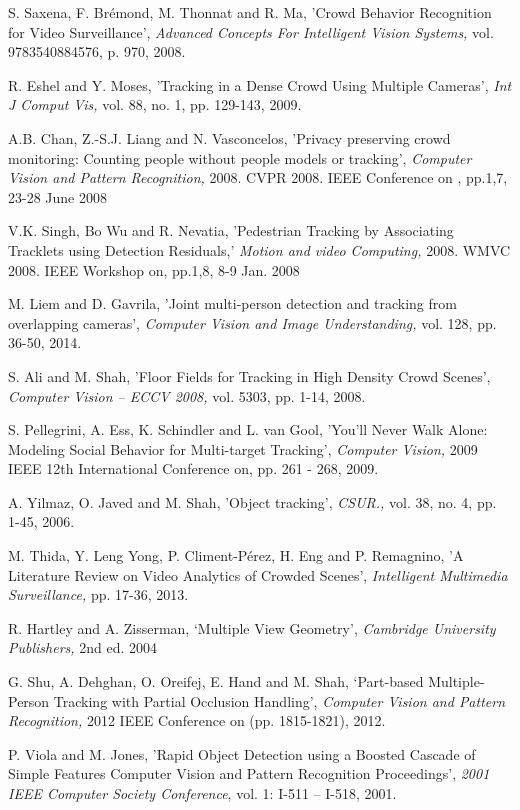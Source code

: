 \documentclass[conference]{IEEEtran}
\begin{document}
\begin{thebibliography}{1}
S. Saxena, F. Brémond, M. Thonnat and R. Ma, 'Crowd Behavior Recognition for Video Surveillance', \textit{Advanced Concepts For Intelligent Vision Systems,} vol. 9783540884576, p. 970, 2008.

R. Eshel and Y. Moses, 'Tracking in a Dense Crowd Using Multiple Cameras', \textit{Int J Comput Vis,} vol. 88, no. 1, pp. 129-143, 2009.

A.B. Chan, Z.-S.J. Liang and N. Vasconcelos, 'Privacy preserving crowd monitoring: Counting people without people models or tracking', \textit{Computer Vision and Pattern Recognition,} 2008. CVPR 2008. IEEE Conference on , pp.1,7, 23-28 June 2008

V.K. Singh, Bo Wu and R. Nevatia, 'Pedestrian Tracking by Associating Tracklets using Detection Residuals,' \textit{Motion and video Computing,} 2008. WMVC 2008. IEEE Workshop on, pp.1,8, 8-9 Jan. 2008

M. Liem and D. Gavrila, 'Joint multi-person detection and tracking from overlapping cameras', \textit{Computer Vision and Image Understanding,} vol. 128, pp. 36-50, 2014.

S. Ali and M. Shah, 'Floor Fields for Tracking in High Density Crowd Scenes', \textit{Computer Vision – ECCV 2008,} vol. 5303, pp. 1-14, 2008.

S. Pellegrini, A. Ess, K. Schindler and L. van Gool, 'You’ll Never Walk Alone: Modeling Social Behavior for Multi-target Tracking', \textit{Computer Vision,} 2009 IEEE 12th International Conference on, pp. 261 - 268, 2009.

A. Yilmaz, O. Javed and M. Shah, 'Object tracking', \textit{CSUR.,} vol. 38, no. 4, pp. 1-45, 2006.

M. Thida, Y. Leng Yong, P. Climent-Pérez, H. Eng and P. Remagnino, 'A Literature Review on Video Analytics of Crowded Scenes', \textit{Intelligent Multimedia Surveillance,} pp. 17-36, 2013.

R. Hartley and A. Zisserman, ‘Multiple View Geometry’, \textit{Cambridge University Publishers,} 2nd ed. 2004

G. Shu, A. Dehghan, O. Oreifej, E. Hand and M. Shah, ‘Part-based Multiple-Person Tracking with Partial Occlusion Handling’, \textit{Computer Vision and Pattern Recognition,} 2012 IEEE Conference on (pp. 1815-1821), 2012.

P. Viola and M. Jones, 'Rapid Object Detection using a Boosted Cascade of Simple Features Computer Vision and Pattern Recognition Proceedings', \textit{2001 IEEE Computer Society Conference}, vol. 1: I-511 – I-518, 2001.

\end{thebibliography}
 
\end{document}
